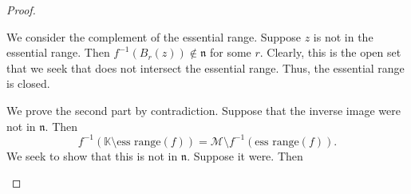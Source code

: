 \begin{proof}
	\begin{parts}
	\item We consider the complement of the essential range. Suppose $z$ is not in the essential range. Then $f^{-1}(B_r(z))\not\in \mathfrak{n}$ for some $r$. Clearly, this is the open set that we seek that does not intersect the essential range. Thus, the essential range is closed.

		We prove the second part by contradiction. Suppose that the inverse image were not in $\mathfrak{n}$. Then
		\[
			f^{-1}(\mathbb{K} \setminus \text{ess range}(f))=\mathcal{M}\setminus f^{-1}(\text{ess range}(f))
		.\] 
		We seek to show that this is not in $\mathfrak{n}$. Suppose it were. Then 
	\end{parts}
\end{proof}
